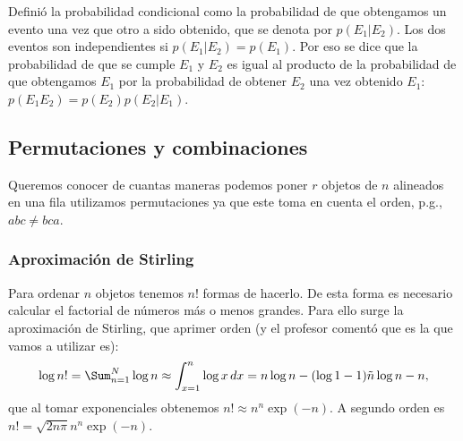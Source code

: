 Definió la probabilidad condicional como la probabilidad de
que obtengamos un evento una vez que otro a sido obtenido,
que se denota por $p(E_1|E_2)$. Los dos eventos son
independientes si $p(E_1|E_2) = p(E_1)$. Por eso se dice que
la probabilidad de que se cumple $E_1$ y $E_2$ es igual al
producto de la probabilidad de que obtengamos $E_1$ por la
probabilidad de obtener $E_2$ una vez obtenido $E_1$: $p(E_1
E_2) = p(E_2) p(E_2|E_1)$.

\subsection{Permutaciones y combinaciones}
Queremos conocer de cuantas maneras podemos poner $r$
objetos de $n$ alineados en una fila utilizamos
permutaciones ya que este toma en cuenta el orden, p.g.,
$abc \neq bca$.

\subsubsection{Aproximación de Stirling}
Para ordenar $n$ objetos tenemos $n!$ formas de hacerlo. De
esta forma es necesario calcular el factorial de números más
o menos grandes. Para ello surge la aproximación de
Stirling, que aprimer orden (y el profesor comentó que es la
que vamos a utilizar es):
\[
  \log n! = \Sum_{n=1}^N \log n \approx \int_{x=1}^n \log x
  \, dx = n \log n - (\log 1 - 1) \tilde n \log n -n,
\]
que al tomar exponenciales obtenemos $n! \approx n^n
\exp(-n)$. A segundo orden es $n! = \sqrt{2n\pi} n^n
\exp(-n)$.

